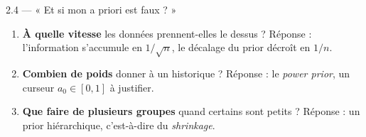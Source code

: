 
\begin{frame}{2.4 — « Et si mon a priori est faux ? »}
\small
\begin{kbox}
\begin{enumerate}
  \item \textbf{À quelle vitesse} les données prennent-elles le dessus ?
        Réponse : l'information s'accumule en $1/\sqrt{n}$, le décalage du prior
        décroît en $1/n$.
  \item \textbf{Combien de poids} donner à un historique ? Réponse : le
        \emph{power prior}, un curseur $a_0 \in [0,1]$ à justifier.
  \item \textbf{Que faire de plusieurs groupes} quand certains sont petits ?
        Réponse : un prior hiérarchique, c'est-à-dire du \emph{shrinkage}.
\end{enumerate}
\end{kbox}
\vspace{1mm}
\end{frame}

